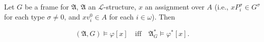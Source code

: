 Let $G$ be a frame for $\mathfrak{A}$, $\mathfrak{A}$ an $\mathcal{L}$-structure, $x$ an assignment over $A$ (i.e., $xP_i^\sigma \in G^\sigma$ for each type $\sigma \neq 0$, and $xv_i^0 \in A$ for each $i \in \omega$). Then

$$(\mathfrak{A}, G) \models \varphi[x] \quad \text{iff} \quad \mathfrak{A}_G^* \models \varphi^*[x].$$

